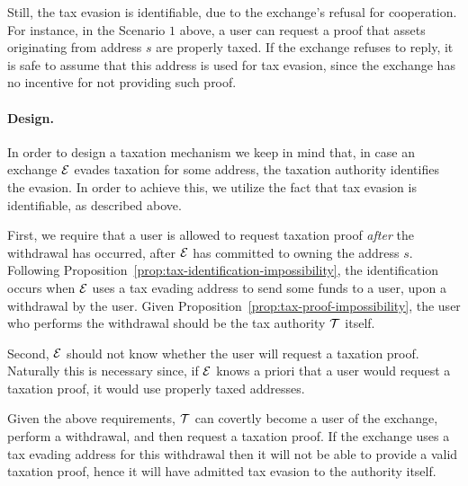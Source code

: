 Still, the tax evasion is identifiable, due to the exchange's refusal for
cooperation. For instance, in the Scenario $1$ above, a user can request a
proof that assets originating from address $s$ are properly taxed. If the
exchange refuses to reply, it is safe to assume that this address is used for
tax evasion, since the exchange has no incentive for not providing such proof.

\paragraph{Design.}

In order to design a taxation mechanism we keep in mind that, in case an
exchange $\mathcal{E}$ evades taxation for some address, the taxation authority
identifies the evasion. In order to achieve this, we utilize the fact that tax
evasion is identifiable, as described above.

First, we require that a user is allowed to request taxation proof \emph{after}
the withdrawal has occurred, \ie after $\mathcal{E}$ has committed to owning the
address $s$. Following Proposition~\ref{prop:tax-identification-impossibility},
the identification occurs when $\mathcal{E}$ uses a tax evading address to send
some funds to a user, \ie upon a withdrawal by the user. Given
Proposition~\ref{prop:tax-proof-impossibility}, the user who performs the
withdrawal should be the tax authority $\mathcal{T}$ itself.

Second, $\mathcal{E}$ should not know whether the user will request a taxation
proof. Naturally this is necessary since, if $\mathcal{E}$ knows a priori that a
user would request a taxation proof, it would use properly taxed addresses.

Given the above requirements, $\mathcal{T}$ can covertly become a user of the
exchange, perform a withdrawal, and then request a taxation proof. If the
exchange uses a tax evading address for this withdrawal then it will not be
able to provide a valid taxation proof, hence it will have admitted tax evasion
to the authority itself.
